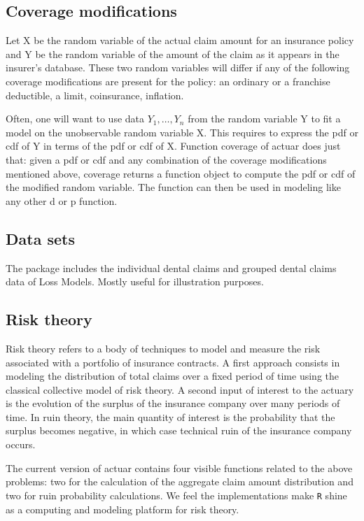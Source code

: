 \documentclass[12pt]{article}
\begin{document}
\subsection{Coverage modifications}

Let X be the random variable of the actual claim amount for an insurance policy and Y be the random variable of the amount of the claim as it appears in the insurer's database. These two random variables will differ if any of the following coverage modifications are present for the policy: an ordinary or a franchise deductible, a limit, coinsurance, inflation. 

Often, one will want to use data $Y_1, \ldots, Y_n$ from the random variable Y to fit a model on the unobservable random variable X. This requires to express the pdf or cdf of Y in terms of the pdf or cdf of X. Function coverage of actuar does just that: given a pdf or cdf and any combination of the coverage modifications mentioned above, coverage returns a function object to compute the pdf or cdf of the modified random variable. The function can then be used in modeling like any other d or p function.

\subsection{Data sets}

The package includes the individual dental claims and grouped dental claims data of Loss Models. Mostly useful for illustration purposes. 

\subsection{Risk theory}

Risk theory refers to a body of techniques to model and measure the risk associated with a portfolio of insurance contracts. A first approach consists in modeling the distribution of total claims over a fixed period of time using the classical collective model of risk theory. A second input of interest to the actuary is the evolution of the surplus of the insurance company over many periods of time. In ruin theory, the main quantity of interest is the probability that the surplus becomes negative, in which case technical ruin of the insurance company occurs.

The current version of actuar contains four visible functions related to the above problems: two for the calculation of the aggregate claim amount distribution and two for ruin probability calculations. We feel the implementations make \texttt{R} shine as a computing and modeling platform for risk theory.
\end{document}
